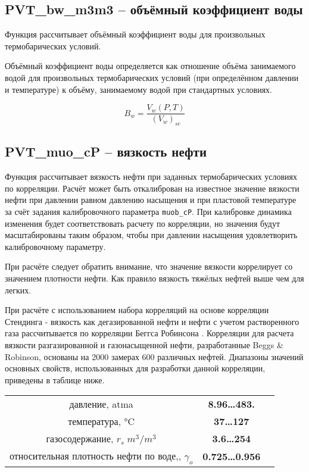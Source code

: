 \subsection{PVT\_bw\_m3m3 – объёмный коэффициент воды}
Функция рассчитывает объёмный коэффициент воды для произвольных термобарических условий. 

Объёмный коэффициент воды определяется как отношение объёма занимаемого водой для произвольных термобарических условий (при определённом давлении и температуре) к объёму, занимаемому водой при стандартных условиях. 

$$B_w = \frac{V_w(P,T)}{(V_w)_{sc}}$$


\subsection{PVT\_muo\_cP – вязкость нефти}
Функция рассчитывает вязкость нефти при заданных термобарических условиях по корреляции. Расчёт может быть откалиброван на известное значение вязкости нефти при давлении равном давлению насыщения и при пластовой температуре за счёт задания калибровочного параметра \texttt{muob_cP}. При калибровке динамика изменения будет соответствовать расчету по корреляции, но значения будут масштабированы таким образом, чтобы при давлении насыщения удовлетворить калибровочному параметру.

При расчёте следует обратить внимание, что значение вязкости коррелирует со значением плотности нефти. Как правило вязкость тяжёлых нефтей выше чем для легких.

При расчёте с использованием набора корреляций на основе корреляции Стендинга - вязкость как дегазированной нефти и нефти с учетом растворенного газа рассчитывается по корреляции Беггса Робинсона \cite{Yukos_PVT_2002}. 
Корреляции для расчета вязкости разгазированной и газонасыщенной нефти, разработанные Beggs \& Robinson, основаны на 2000 замерах 600 различных нефтей.
Диапазоны значений основных свойств, использованных для разработки данной корреляции, приведены в таблице ниже.
\begin{center}
	\begin{tabular}{ccc}
		давление, atma & \textbf{8.96…483.} \\
		температура, °C & \textbf{37…127}  \\
		газосодержание, $r_s \; m^3 /m^3$ & \textbf{3.6…254}\\
		относительная плотность нефти по воде,, $\gamma_o$ & \textbf{0.725…0.956} \\
	\end{tabular}
\end{center}
   
